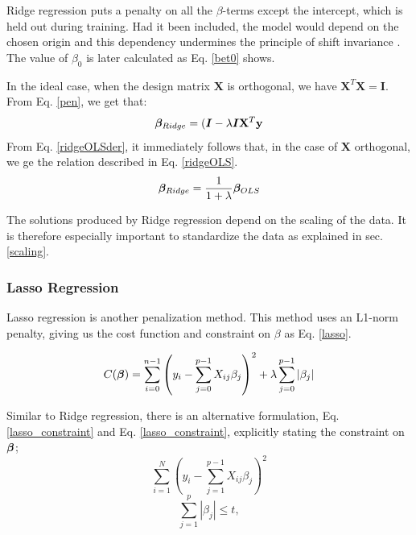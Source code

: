 Ridge regression puts a penalty on all the $\beta$-terms except the intercept, which is held out during training. Had it been included, the model would depend on the chosen origin and this dependency undermines the principle of shift invariance \citep[p. 63]{hastie}.
The value of $\beta_0$ is later calculated as Eq. \ref{bet0} shows. 

In the ideal case, when the design matrix $\mathbf{X}$ is orthogonal, we have $\mathbf{X}^T\mathbf{X} = \boldsymbol{I}$. From Eq. \ref{pen}, we get that:
\begin{equation}\label{ridgeOLSder}
    \boldsymbol{\beta}_{Ridge} = (\boldsymbol{I} - \lambda\boldsymbol{I} \mathbf{X}^T \mathbf{y}
\end{equation}
From Eq. \ref{ridgeOLSder}, it immediately follows that, in the case of $\mathbf{X}$ orthogonal, we ge the relation described in Eq. \ref{ridgeOLS}.
\begin{equation}\label{ridgeOLS}
    \boldsymbol{\beta}_{Ridge} = \frac{1}{1+\lambda}\boldsymbol{\beta}_{OLS}
\end{equation}

The solutions produced by Ridge regression depend on the scaling of the data. It is therefore especially important to standardize the data as explained in sec. \ref{scaling}.



\subsubsection{Lasso Regression}

Lasso regression is another penalization method. This method uses an L1-norm penalty, giving us the cost function and constraint on $\beta$ as Eq. \ref{lasso}. 

\begin{equation}\label{lasso}
     C(\boldsymbol{\beta}) = \sum_{i=0}^{n-1} \left( y_i - \sum_{j=0}^{p-1} X_{ij}\beta_j \right)^2 + \lambda\sum_{j=0}^{p-1} |\beta_j|
\end{equation}

Similar to Ridge regression, there is an alternative formulation, Eq. \ref{lasso_constraint} and Eq. \ref{lasso_constraint}, explicitly stating the constraint on $\boldsymbol{\beta}$;
\begin{equation}\label{lasso_alt}
    \sum_{i=1}^N \left(y_i - \sum_{j=1}^{p-1} X_{ij}\beta_j \right)^2
\end{equation}
\begin{equation}\label{lasso_constraint}
    \sum_{j=1}^p | \beta_j | \leq t, 
\end{equation}


